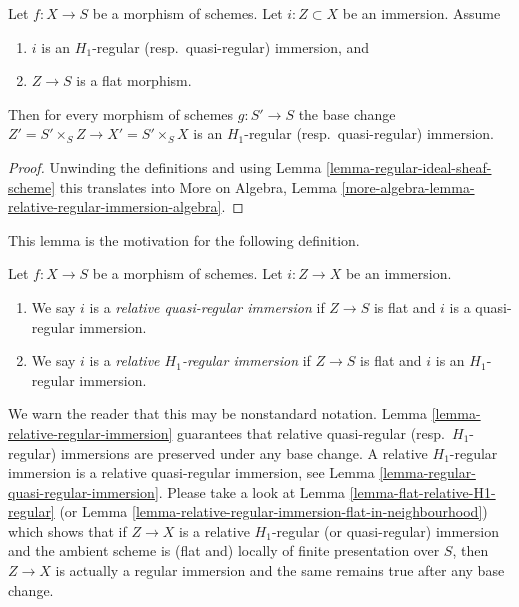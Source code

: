 \begin{lemma}
\label{lemma-relative-regular-immersion}
Let $f : X \to S$ be a morphism of schemes.
Let $i : Z \subset X$ be an immersion.
Assume
\begin{enumerate}
\item $i$ is an $H_1$-regular (resp.\ quasi-regular) immersion, and
\item $Z \to S$ is a flat morphism.
\end{enumerate}
Then for every morphism of schemes $g : S' \to S$ the base change
$Z' = S' \times_S Z \to X' = S' \times_S X$
is an $H_1$-regular (resp.\ quasi-regular) immersion.
\end{lemma}

\begin{proof}
Unwinding the definitions and using
Lemma \ref{lemma-regular-ideal-sheaf-scheme}
this translates into More on Algebra, Lemma
\ref{more-algebra-lemma-relative-regular-immersion-algebra}.
\end{proof}

\noindent
This lemma is the motivation for the following definition.

\begin{definition}
\label{definition-relative-H1-regular-immersion}
Let $f : X \to S$ be a morphism of schemes.
Let $i : Z \to X$ be an immersion.
\begin{enumerate}
\item We say $i$ is a {\it relative quasi-regular immersion}
if $Z \to S$ is flat and $i$ is a quasi-regular immersion.
\item We say $i$ is a {\it relative $H_1$-regular immersion}
if $Z \to S$ is flat and $i$ is an $H_1$-regular immersion.
\end{enumerate}
\end{definition}

\noindent
We warn the reader that this may be nonstandard notation.
Lemma \ref{lemma-relative-regular-immersion}
guarantees that relative quasi-regular (resp.\ $H_1$-regular)
immersions are preserved under any base change.
A relative $H_1$-regular immersion is a relative quasi-regular immersion, see
Lemma \ref{lemma-regular-quasi-regular-immersion}.
Please take a look at
Lemma \ref{lemma-flat-relative-H1-regular}
(or
Lemma \ref{lemma-relative-regular-immersion-flat-in-neighbourhood})
which shows that if $Z \to X$ is a relative $H_1$-regular
(or quasi-regular) immersion and the ambient scheme is (flat and)
locally of finite presentation over $S$, then $Z \to X$
is actually a regular immersion and the same remains true after
any base change.

